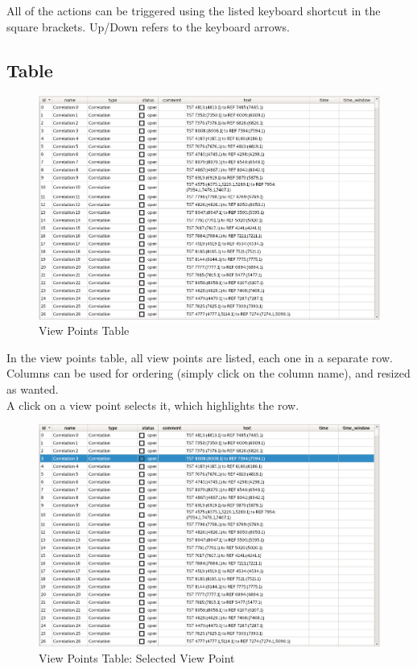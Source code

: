 All of the actions can be triggered using the listed keyboard shortcut in the square brackets. Up/Down refers to the keyboard arrows.

\subsection{Table}

\begin{figure}[H]
    \hspace*{-2cm}
    \includegraphics[width=18cm,frame]{figures/view_points_table.png}
  \caption{View Points Table}
\end{figure}

In the view points table, all view points are listed, each one in a separate row. Columns can be used for ordering (simply click on the column name), and resized as wanted. \\

A click on a view point selects it, which highlights the row.

\begin{figure}[H]
    \hspace*{-2cm}
    \includegraphics[width=18cm,frame]{figures/view_points_table_selected.png}
  \caption{View Points Table: Selected View Point}
\end{figure}

